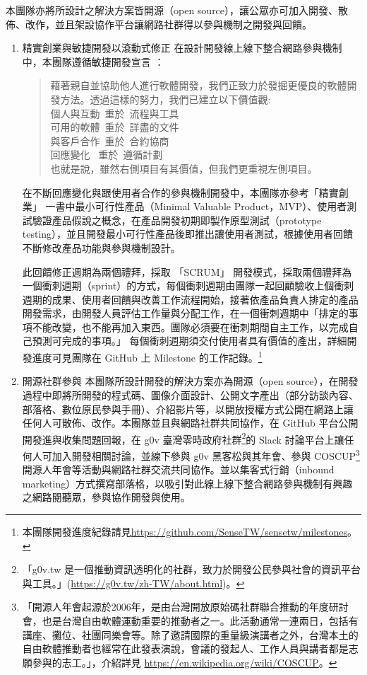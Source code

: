 \documentclass[12pt,a4paper]{article}
\begin{document}
本團隊亦將所設計之解決方案皆開源（open source），讓公眾亦可加入開發、散佈、改作，並且架設協作平台讓網路社群得以參與機制之開發與回饋。
\begin{enumerate}
\item 精實創業與敏捷開發以滾動式修正
\label{sec:org881c396}
在設計開發線上線下整合網路參與機制中，本團隊遵循敏捷開發宣言 \cite{agile_development} ：

\begin{verse}
藉著親自並協助他人進行軟體開發，我們正致力於發掘更優良的軟體開發方法。透過這樣的努力，我們已建立以下價值觀:\\
\vspace*{1em}
個人與互動 重於 流程與工具\\
可用的軟體 重於 詳盡的文件\\
與客戶合作 重於 合約協商\\
回應變化   重於 遵循計劃\\
\vspace*{1em}
也就是說，雖然右側項目有其價值，但我們更重視左側項目。\\
\end{verse}

在不斷回應變化與跟使用者合作的參與機制開發中，本團隊亦參考「精實創業」 \cite{lai17_jing} 一書中最小可行性產品（Minimal Valuable Product，MVP）、使用者測試驗證產品假說之概念，在產品開發初期即製作原型測試（prototype testing），並且開發最小可行性產品後即推出讓使用者測試，根據使用者回饋不斷修改產品功能與參與機制設計。

此回饋修正週期為兩個禮拜，採取 「SCRUM」\cite{sutherland18_scrum} 開發模式，採取兩個禮拜為一個衝刺週期（sprint）的方式，每個衝刺週期由團隊一起回顧驗收上個衝刺週期的成果、使用者回饋與改善工作流程開始，接著依產品負責人排定的產品開發需求，由開發人員評估工作量與分配工作，在一個衝刺週期中「排定的事項不能改變，也不能再加入東西。團隊必須要在衝刺期間自主工作，以完成自己預測可完成的事項。」\citep[p. 328]{sutherland18_scrum} 每個衝刺週期須交付使用者具有價值的產出，詳細開發進度可見團隊在 GitHub 上 Milestone 的工作記錄。\footnote{本團隊開發進度紀錄請見\url{https://github.com/SenseTW/sensetw/milestones}。}
\item 開源社群參與
\label{sec:orga131413}
本團隊所設計開發的解決方案亦為開源（open source），在開發過程中即將所開發的程式碼、圖像介面設計、公開文字產出（部分訪談內容、部落格、數位原民參與手冊）、介紹影片等，以開放授權方式公開在網路上讓任何人可散佈、改作。本團隊並且與網路社群共同協作，在 GitHub 平台公開開發進與收集問題回報，在 g0v 臺灣零時政府社群\footnote{「g0v.tw 是一個推動資訊透明化的社群，致力於開發公民參與社會的資訊平台與工具。」(\url{https://g0v.tw/zh-TW/about.html})。}的 Slack 討論平台上讓任何人可加入開發相關討論，並線下參與 g0v 黑客松與其年會、參與 COSCUP\footnote{「開源人年會起源於2006年，是由台灣開放原始碼社群聯合推動的年度研討會，也是台灣自由軟體運動重要的推動者之一。此活動通常一連兩日，包括有講座、攤位、社團同樂會等。除了邀請國際的重量級演講者之外，台灣本土的自由軟體推動者也經常在此發表演說，會議的發起人、工作人員與講者都是志願參與的志工。」，介紹詳見 \url{https://en.wikipedia.org/wiki/COSCUP}。} 開源人年會等活動與網路社群交流共同協作。並以集客式行銷（inbound marketing）方式撰寫部落格，以吸引對此線上線下整合網路參與機制有興趣之網路閱聽眾，參與協作開發與使用。


\end{enumerate}
\end{document}
